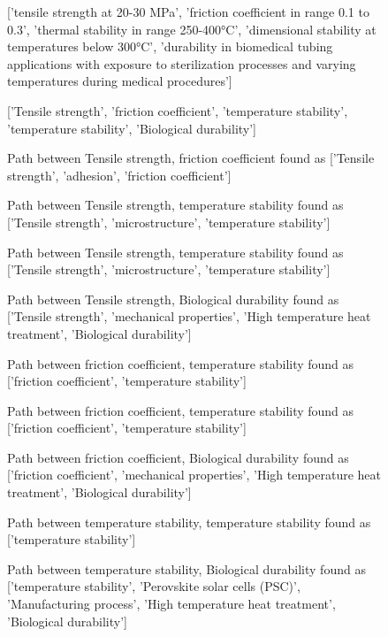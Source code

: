 \begin{figure}[t!]
  \begin{mdframed}[
    frametitle={Creative GraphWeave Agent Using Shortest Simple Path Algorithm},
    frametitlefont=\bfseries\sffamily\small,
    backgroundcolor=white,
    linecolor=black,
    linewidth=0.5pt,
    innerleftmargin=6pt,
    innerrightmargin=6pt,
    innertopmargin=6pt,
    innerbottommargin=6pt
  ]
    \ttfamily\scriptsize
    
    \textbf{}
     ['tensile strength at 20-30 MPa', 'friction coefficient in range 0.1 to 0.3', 'thermal stability in range 250-400°C', 'dimensional stability at temperatures below 300°C', 'durability in biomedical tubing applications with exposure to sterilization processes and varying temperatures during medical procedures']
    
    \textbf{}
    ['Tensile strength', 'friction coefficient', 'temperature stability', 'temperature stability', 'Biological durability']
    
    Path between Tensile strength, friction coefficient found as ['Tensile strength', 'adhesion', 'friction coefficient']
    
    Path between Tensile strength, temperature stability found as ['Tensile strength', 'microstructure', 'temperature stability']
    
    Path between Tensile strength, temperature stability found as ['Tensile strength', 'microstructure', 'temperature stability']
    
    Path between Tensile strength, Biological durability found as ['Tensile strength', 'mechanical properties', 'High temperature heat treatment', 'Biological durability']
    
    Path between friction coefficient, temperature stability found as ['friction coefficient', 'temperature stability']
    
    Path between friction coefficient, temperature stability found as ['friction coefficient', 'temperature stability']
    
    Path between friction coefficient, Biological durability found as ['friction coefficient', 'mechanical properties', 'High temperature heat treatment', 'Biological durability']
    
    Path between temperature stability, temperature stability found as ['temperature stability']
    
    Path between temperature stability, Biological durability found as ['temperature stability', 'Perovskite solar cells (PSC)', 'Manufacturing process', 'High temperature heat treatment', 'Biological durability']
    

\end{mdframed}
\end{figure}

